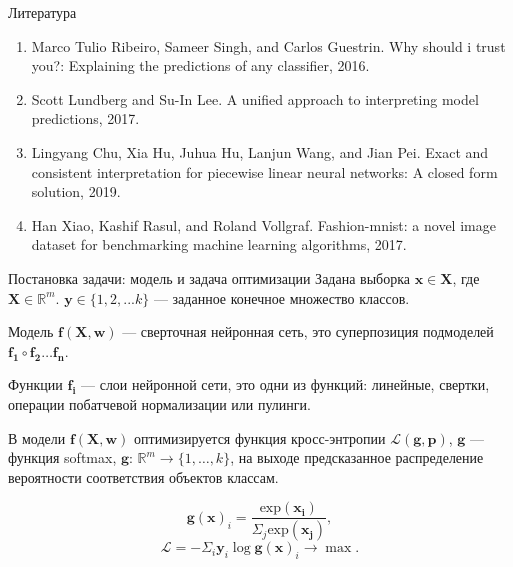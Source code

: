 \documentclass{beamer}
\begin{document}
\begin{frame}{Литература}
\begin{enumerate}
	\item Marco Tulio Ribeiro, Sameer Singh, and Carlos Guestrin. Why should i trust you?: Explaining the
predictions of any classifier, 2016.
	\item Scott Lundberg and Su-In Lee. A unified approach to interpreting model predictions, 2017.
	\item Lingyang Chu, Xia Hu, Juhua Hu, Lanjun Wang, and Jian Pei. Exact and consistent interpretation for
piecewise linear neural networks: A closed form solution, 2019.
	\item Han Xiao, Kashif Rasul, and Roland Vollgraf. Fashion-mnist: a novel image dataset for benchmarking
machine learning algorithms, 2017.
\end{enumerate}
\end{frame}
\begin{frame}{Постановка задачи: модель и задача оптимизации}
Задана выборка $\mathbf{x} \in \mathbf{X}$, где $\mathbf{X} \in \mathbb{R}^m$. $\mathbf{y} \in \{1, 2, ... k\}$ --- заданное конечное множество классов.

Модель $\mathbf{f}(\mathbf{X}, \mathbf{w})$ --- сверточная нейронная сеть, это суперпозиция подмоделей $\mathbf{f_1} \circ \mathbf{f_2} \dots \mathbf{f_n}$.

Функции $\mathbf{f_i}$ --- слои нейронной сети, это одни из функций: линейные, свертки, операции побатчевой нормализации или пулинги.

В модели $\mathbf{f}(\mathbf{X}, \mathbf{w})$ оптимизируется функция кросс-энтропии $\mathcal{L}(\mathbf{g}, \mathbf{p})$, $\mathbf{g}$ --- функция softmax, $\mathbf{g}$: $\mathbb{R}^m \to \{1,\dots,k\}$, на выходе предсказанное распределение вероятности соответствия объектов классам.

$$\mathbf{g}(\mathbf{x})_i = \frac{\text{exp}(\mathbf{x_i})}{\Sigma_j \text{exp}(\mathbf{x_j})},$$
$$\mathcal{L} = -\Sigma_i \mathbf{y}_i \log \mathbf{g}(\mathbf{x})_i \to \max.$$

\end{frame}
\end{document}
